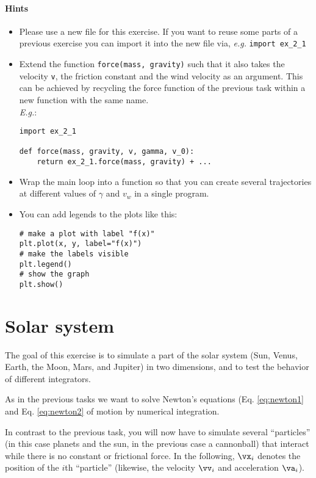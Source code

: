 \paragraph{Hints}
\begin{itemize}
  \item Please use a new file for this exercise. If you want to reuse some parts of
        a previous exercise you can import it into the new file via, \textit{e.g.} \lstinline{import ex_2_1}
  \item Extend the function \lstinline!force(mass, gravity)! such that it also
    takes the velocity \lstinline!v!, the friction constant and the wind velocity as an argument.
    This can be achieved by recycling the force function of the previous task within a new function
    with the same name.\\
    \textit{E.g.}:
    \begin{lstlisting}
import ex_2_1

def force(mass, gravity, v, gamma, v_0):
    return ex_2_1.force(mass, gravity) + ...
    \end{lstlisting}
  \item Wrap the main loop into a function so that you can create
    several trajectories at different values of $\gamma$ and $v_w$ in a
    single program.
  \item You can add legends to the plots like this:
    \begin{lstlisting}
# make a plot with label "f(x)"
plt.plot(x, y, label="f(x)")
# make the labels visible
plt.legend()
# show the graph
plt.show()
    \end{lstlisting}
\end{itemize}
\clearpage

\section{Solar system}

The goal of this exercise is to simulate a part of the solar system (Sun,
Venus, Earth, the Moon, Mars, and Jupiter) in two dimensions, and to test the behavior of
different integrators.

As in the previous tasks we want to solve Newton's equations (Eq.
\eqref{eq:newton1} and Eq. \eqref{eq:newton2} of motion by numerical
integration.

In contrast to the previous task, you will now have to simulate several
``particles'' (in this case planets and the sun, in the previous case a
cannonball) that interact while there is no constant or frictional force.  
In the following, $\vx_i$ denotes the position of the $i$th ``particle''
(likewise, the velocity $\vv_i$ and acceleration $\va_i$).

